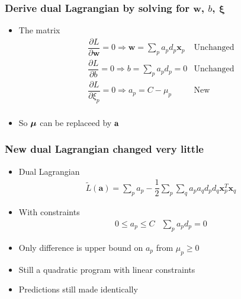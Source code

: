 \documentclass[12pt,notes,mathserif]{beamer}
\begin{document}
\begin{frame}[c]
\frametitle{Derive dual Lagrangian by solving for $\mathbf{w}$, $b$, $\mathbf{\xi}$}
\begin{itemize}
\item The matrix
\[
\begin{matrix}
\dfrac{\partial L}{\partial \mathbf{w}}=0 \Rightarrow \mathbf{w}=\sum\limits_pa_pd_p\mathbf{x}_p&\text{Unchanged}\\
\dfrac{\partial L}{\partial b}=0 \Rightarrow b=\sum\limits_pa_pd_p=0&\text{Unchanged}\\
\dfrac{\partial L}{\partial \xi_p}=0 \Rightarrow a_p=C-\mu_p&\text{New}\\
\end{matrix}
\]
\item So $\boldsymbol{\mu}$ can be replaceed by $\mathbf{a}$
\end{itemize}
\end{frame}



\begin{frame}[c]
\frametitle{New dual Lagrangian changed very little}
\begin{itemize}
\item Dual Lagrangian
\begin{gather*}
\tilde{L}(\mathbf{a})=\sum_pa_p-\dfrac{1}{2}\sum_p\sum_qa_pa_qd_pd_q\mathbf{x}_p^T\mathbf{x}_q
\end{gather*}
\item With constraints
\[\begin{matrix}
0\leqslant{}a_p\leqslant{}C&\sum\limits_pa_pd_p=0
\end{matrix}\]
\item Only difference is upper bound on $a_p$ from $\mu_p \geqslant{}0$
\item Still a quadratic program with linear constraints
\item Predictions still made identically
\end{itemize}
\end{frame}
\end{document}
